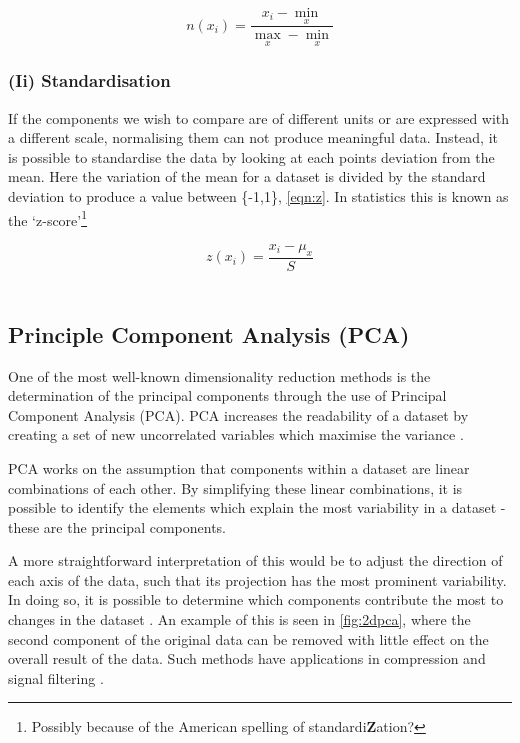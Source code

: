 \begin{equation}
    n(x_i) = \frac{x_i - \min_x }{\max_x - \min_x}
    \label{eqn:n}
\end{equation}



\subsubsection*{(Ii) Standardisation}
If the components we wish to compare are of different units or are expressed with a different scale, normalising them can not produce meaningful data. Instead, it is possible to standardise the data by looking at each points deviation from the mean. Here the variation of the mean for a dataset is divided by the standard deviation to produce a value between \{-1,1\}, \autoref{eqn:z}. In statistics this is known as the `z-score'\footnote{Possibly because of the American spelling of standardi\textbf{Z}ation?}

\begin{equation}
    z(x_i) = \frac{x_i - \mu_x}{S}
    \label{eqn:z}
\end{equation}\\


\subsection{Principle Component Analysis (PCA)}
One of the most well-known dimensionality reduction methods is the determination of the principal components through the use of Principal Component Analysis (PCA). PCA increases the readability of a dataset by creating a set of new uncorrelated variables which maximise the variance \citep{pcareview}.


 PCA works on the assumption that components within a dataset are linear combinations of each other. By simplifying these linear combinations, it is possible to identify the elements which explain the most variability in a dataset - these are the principal components.

A more straightforward interpretation of this would be to adjust the direction of each axis of the data, such that its projection has the most prominent variability. In doing so, it is possible to determine which components contribute the most to changes in the dataset \citep{pca,pca2}. An example of this is seen in \autoref{fig:2dpca}, where the second component of the original data can be removed with little effect on the overall result of the data. Such methods have applications in compression and signal filtering \citep{pcacompress,pcanoise}.


